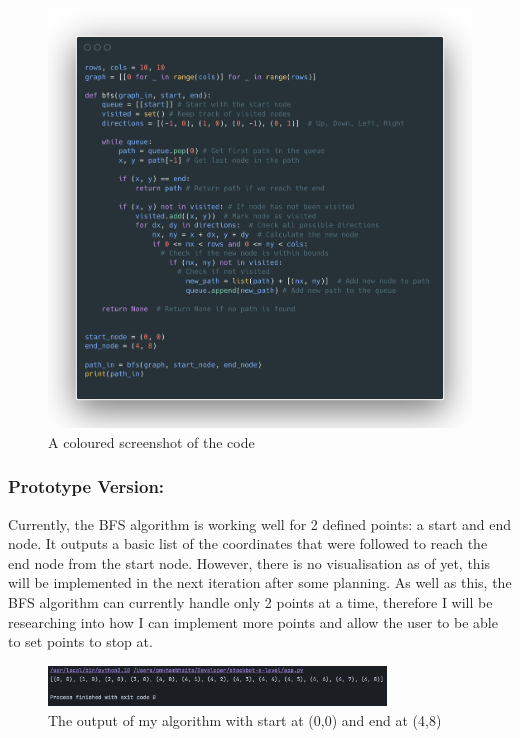 \newpage

\begin{figure}[htbp!]
    \centering
    \includegraphics[width=1\linewidth]{Images/Source Code Image (2).png}
    \caption{A coloured screenshot of the code}
\end{figure}
\textbf{}\newline
\newpage

\subsubsection{Prototype Version:} 
Currently, the BFS algorithm is working well for 2 defined points: a start and end node. It outputs a basic list of the coordinates that were followed to reach the end node from the start node. However, there is no visualisation as of yet, this will be implemented in the next iteration after some planning. As well as this, the BFS algorithm can currently handle only 2 points at a time, therefore I will be researching into how I can implement more points and allow the user to be able to set points to stop at.
\begin{figure}[htbp]
    \centering
    \includegraphics[width=0.8\textwidth]{Images/Screenshot 2025-03-30 at 11.18.52.png}
    \caption{The output of my algorithm with start at (0,0) and end at (4,8)}
\end{figure}

